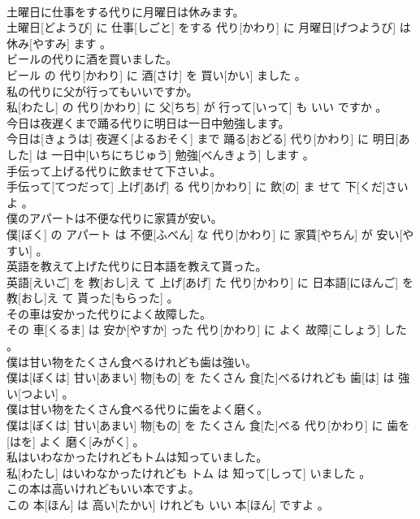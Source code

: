 \documentclass[8pt]{extreport}
\begin{document}
\begin{CJK}{UTF8}{min}
\\	土曜日に仕事をする代りに月曜日は休みます。	
\\	土曜日[どようび] に 仕事[しごと] をする 代り[かわり] に 月曜日[げつようび] は 休み[やすみ] ます 。
\\	ビールの代りに酒を買いました。	
\\	ビール の 代り[かわり] に 酒[さけ] を 買い[かい] ました 。
\\	私の代りに父が行ってもいいですか。	
\\	私[わたし] の 代り[かわり] に 父[ちち] が 行って[いって] も いい ですか 。
\\	今日は夜遅くまで踊る代りに明日は一日中勉強します。	
\\	今日は[きょうは] 夜遅く[よるおそく] まで 踊る[おどる] 代り[かわり] に 明日[あした] は 一日中[いちにちじゅう] 勉強[べんきょう] します 。
\\	手伝って上げる代りに飲ませて下さいよ。	
\\	手伝って[てつだって] 上げ[あげ] る 代り[かわり] に 飲[の] ま せて 下[くだ]さい よ 。
\\	僕のアパートは不便な代りに家賃が安い。	
\\	僕[ぼく] の アパート は 不便[ふべん] な 代り[かわり] に 家賃[やちん] が 安い[やすい] 。
\\	英語を教えて上げた代りに日本語を教えて貰った。	
\\	英語[えいご] を 教[おし]え て 上げ[あげ] た 代り[かわり] に 日本語[にほんご] を 教[おし]え て 貰った[もらった] 。
\\	その車は安かった代りによく故障した。	
\\	その 車[くるま] は 安か[やすか] った 代り[かわり] に よく 故障[こしょう] した 。
\\	僕は甘い物をたくさん食べるけれども歯は強い。	
\\	僕は[ぼくは] 甘い[あまい] 物[もの] を たくさん 食[た]べるけれども 歯[は] は 強い[つよい] 。
\\	僕は甘い物をたくさん食べる代りに歯をよく磨く。	
\\	僕は[ぼくは] 甘い[あまい] 物[もの] を たくさん 食[た]べる 代り[かわり] に 歯を[はを] よく 磨く[みがく] 。
\\	私はいわなかったけれどもトムは知っていました。	
\\	私[わたし] はいわなかったけれども トム は 知って[しって] いました 。
\\	この本は高いけれどもいい本ですよ。	
\\	この 本[ほん] は 高い[たかい] けれども いい 本[ほん] ですよ 。

\end{CJK}
\end{document}
